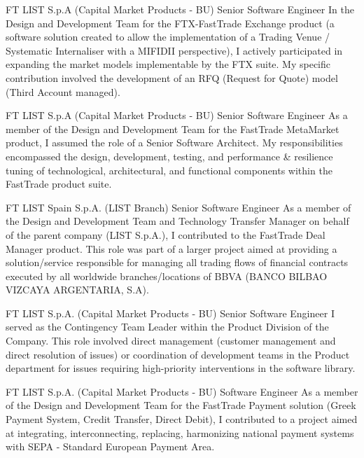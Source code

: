 \documentclass[10pt]{article} %
\begin{document}
\begin{paracol}{2}
{FT} %
{LIST S.p.A (Capital Market Products - BU)} %
{Senior Software Engineer} %
{In the Design and Development Team for the FTX-FastTrade Exchange product (a software solution created
to allow the implementation of a Trading Venue / Systematic Internaliser with a MIFIDII perspective),
I actively participated in expanding the market models implementable by the FTX suite.
My specific contribution involved the development of an RFQ (Request for Quote) model
(Third Account managed).} %

{FT} %
{LIST S.p.A (Capital Market Products - BU)} %
{Senior Software Engineer} %
{As a member of the Design and Development Team for the FastTrade MetaMarket product, I assumed the role
of a Senior Software Architect. My responsibilities encompassed the design, development, testing, and
performance \& resilience tuning of technological, architectural, and functional components within the
FastTrade product suite.} %

{FT} %
{LIST Spain S.p.A. (LIST Branch)} %
{Senior Software Engineer} %
{As a member of the Design and Development Team and Technology Transfer Manager on behalf of the parent
company (LIST S.p.A.), I contributed to the FastTrade Deal Manager product. This role was part of a larger
project aimed at providing a solution/service responsible for managing all trading flows of financial contracts
executed by all worldwide branches/locations of BBVA (BANCO BILBAO VIZCAYA ARGENTARIA, S.A).} %

{FT} %
{LIST S.p.A. (Capital Market Products - BU)} %
{Senior Software Engineer} %
{I served as the Contingency Team Leader within the Product Division of the Company. This role involved direct
management (customer management and direct resolution of issues) or coordination of development teams in the
Product department for issues requiring high-priority interventions in the software library.
} %

{FT} %
{LIST S.p.A. (Capital Market Products - BU)} %
{Software Engineer} %
{As a member of the Design and Development Team for the FastTrade Payment solution (Greek Payment System,
Credit Transfer, Direct Debit), I contributed to a project aimed at integrating, interconnecting, replacing,
harmonizing national payment systems with SEPA - Standard European Payment Area.} %


\end{paracol}
\end{document}
